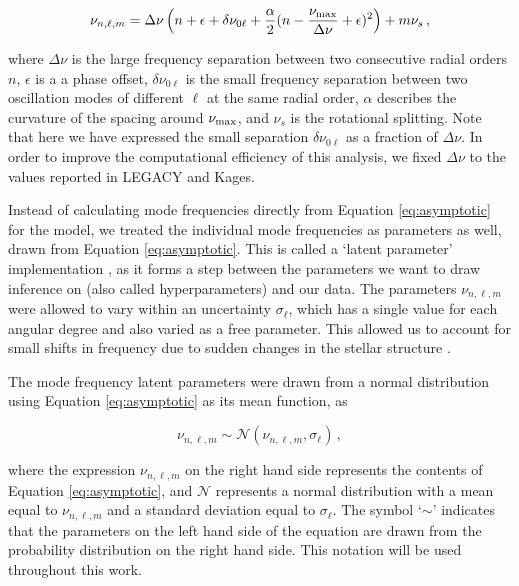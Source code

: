 \documentclass[12pt]{article}
\newcommand{\numax}{\mbox{$\nu_{\rm max}$}\xspace}
\newcommand{\dnu}{\mbox{$\Delta \nu$}\xspace}
\begin{document}
\begin{equation}\label{eq:asymptotic}
	\nu_{n,\ell,m} = \dnu\left(n + \epsilon + \delta\nu_{0\ell} + \frac{\alpha}{2}(n - \frac{\numax}{\dnu} + \epsilon)^2\right) + m\nu_{s}\, ,
\end{equation}

\noindent where \dnu is the large frequency separation between two consecutive radial orders $n$, $\epsilon$ is a a phase offset, $\delta\nu_{0\ell}$ is the small frequency separation between two oscillation modes of different $\ell$ at the same radial order, $\alpha$ describes the curvature of the spacing around \numax, and $\nu_s$ is the rotational splitting. Note that here we have expressed the small separation $\delta\nu_{0\ell}$ as a fraction of $\dnu$. In order to improve the computational efficiency of this analysis, we fixed \dnu to the values reported in LEGACY and Kages.

Instead of calculating mode frequencies directly from Equation \ref{eq:asymptotic} for the model, we treated the individual mode frequencies as parameters as well, drawn from Equation \ref{eq:asymptotic}. This is called a `latent parameter' implementation \cite{hogg2012, hall+2019}, as it forms a step between the parameters we want to draw inference on (also called hyperparameters) and our data. 
The parameters $\nu_{n,\ell,m}$ were allowed to vary within an uncertainty $\sigma_{\ell}$, which has a single value for each angular degree and also varied as a free parameter.
This allowed us to account for small shifts in frequency due to sudden changes in the stellar structure \cite{mazumdar+2014}. 

The mode frequency latent parameters were drawn from a normal distribution using Equation \ref{eq:asymptotic} as its mean function, as

\begin{equation}
	\nu_{n, \ell, m} \sim \mathcal{N}(\nu_{n, \ell, m}, \sigma_{\ell})\, ,
\end{equation}

\noindent where the expression $\nu_{n, \ell, m}$ on the right hand side represents the contents of Equation \ref{eq:asymptotic}, and $\mathcal{N}$ represents a normal distribution with a mean equal to $\nu_{n, \ell, m}$ and a standard deviation equal to $\sigma_{\ell}$. The symbol `$\sim$' indicates that the parameters on the left hand side of the equation are drawn from the probability distribution on the right hand side. This notation will be used throughout this work.
\end{document}

